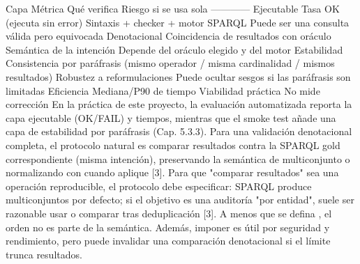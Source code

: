 {}\markdownRendererPipe{} Capa \markdownRendererPipe{} Métrica \markdownRendererPipe{} Qué verifica \markdownRendererPipe{} Riesgo si se usa sola \markdownRendererPipe{} \markdownRendererPipe{}---\markdownRendererPipe{}---\markdownRendererPipe{}---\markdownRendererPipe{}---\markdownRendererPipe{} \markdownRendererPipe{} Ejecutable \markdownRendererPipe{} Tasa OK (ejecuta sin error) \markdownRendererPipe{} Sintaxis + checker + motor SPARQL \markdownRendererPipe{} Puede ser una consulta válida pero equivocada \markdownRendererPipe{} \markdownRendererPipe{} Denotacional \markdownRendererPipe{} Coincidencia de resultados con oráculo \markdownRendererPipe{} Semántica de la intención \markdownRendererPipe{} Depende del oráculo elegido y del motor \markdownRendererPipe{} \markdownRendererPipe{} Estabilidad \markdownRendererPipe{} Consistencia por paráfrasis (mismo operador / misma cardinalidad / mismos resultados) \markdownRendererPipe{} Robustez a reformulaciones \markdownRendererPipe{} Puede ocultar sesgos si las paráfrasis son limitadas \markdownRendererPipe{} \markdownRendererPipe{} Eficiencia \markdownRendererPipe{} Mediana/P90 de tiempo \markdownRendererPipe{} Viabilidad práctica \markdownRendererPipe{} No mide corrección \markdownRendererPipe{}\markdownRendererInterblockSeparator
{}En la práctica de este proyecto, la evaluación automatizada reporta la capa ejecutable (OK/FAIL) y tiempos, mientras que el smoke test añade una capa de estabilidad por paráfrasis (Cap. 5.3.3). Para una validación denotacional completa, el protocolo natural es comparar resultados contra la SPARQL gold correspondiente (misma intención), preservando la semántica de multiconjunto o normalizando con  cuando aplique [3].\markdownRendererInterblockSeparator
{}\markdownRendererInterblockSeparator
{}Para que "comparar resultados" sea una operación reproducible, el protocolo debe especificar:\markdownRendererInterblockSeparator
{}\markdownRendererUlBeginTight
\markdownRendererUlItem {} SPARQL produce multiconjuntos por defecto; si el objetivo es una auditoría "por entidad", suele ser razonable usar  o comparar tras deduplicación [3].\markdownRendererUlItemEnd 
\markdownRendererUlItem {} A menos que se defina , el orden no es parte de la semántica. Además, imponer  es útil por seguridad y rendimiento, pero puede invalidar una comparación denotacional si el límite trunca resultados.\markdownRendererUlItemEnd 
